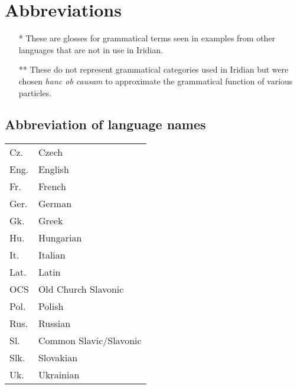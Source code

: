 
\chapter*{Abbreviations}
\printglossary[style=myglosses,type=\leipzigtype, title={Glossing abbreviations}]

\smallskip

{\small
\begin{itemize}
\item[*] These are glosses for grammatical terms seen in examples from other languages that are not in use in Iridian.
\item[**] These do not represent grammatical categories used in Iridian but were chosen \emph{hanc ob causam} to approximate the grammatical function of various particles.
\end{itemize}}

\bigskip
\printglossary[style=langlist,type=\acronymtype, title={Abbreviation of language names}]

\clearpage

\section*{Abbreviation of language names}
\iffalse
\begin{longtabu} {YY[2.5]}
	Cz.		& Czech\\
	Eng.	& English\\
	Fr.		& French\\
	Ger.	& German\\
	Gk.		& Greek\\
	Hu.		& Hungarian\\
	It.		& Italian\\
	Lat.	& Latin\\
	OCS		& Old Church Slavonic\\
	Pol.	& Polish\\
	Rus.	& Russian\\
	Sl.		& Common Slavic/Slavonic\\
	Slk.	& Slovakian\\
	Uk.		& Ukrainian\\
\end{longtabu}


